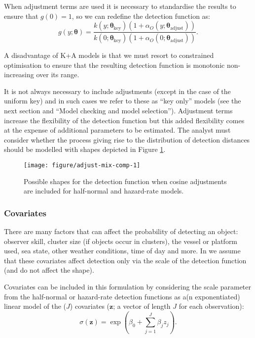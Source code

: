 \documentclass[article]{jss}\usepackage[]{graphicx}\usepackage[]{color}
\makeatletter
\def\maxwidth{ %
  \ifdim\Gin@nat@width>\linewidth
    \linewidth
  \else
    \Gin@nat@width
  \fi
}
\makeatother
\begin{document}
When adjustment terms are used it is necessary to standardise the results to ensure that $g(0)=1$, so we can redefine the detection function as:
$$
g(y; \boldsymbol{\theta}) = \frac{k(y; \boldsymbol{\theta}_\text{key})\left( 1+ \alpha_O(y; \boldsymbol{\theta}_\text{adjust})\right)}{k(0; \boldsymbol{\theta}_\text{key})\left( 1+ \alpha_O(0; \boldsymbol{\theta}_\text{adjust})\right)}.
$$

A disadvantage of K+A models is that we must resort to constrained optimisation \citep[via the  package;][]{rsolnp-pkg} to ensure that the resulting detection function is monotonic non-increasing over its range.

It is not always necessary to include adjustments (except in the case of the uniform key) and in such cases we refer to these as ``key only'' models (see the next section and ``Model checking and model selection''). Adjustment terms increase the flexibility of the detection function but this added flexibility comes at the expense of additional parameters to be estimated. The analyst must consider whether the process giving rise to the distribution of detection distances should be modelled with shapes depicted in Figure \ref{fig:keyadj}.

\begin{figure}
\begin{center}
\begin{Schunk}

\texttt{[image: figure/adjust-mix-comp-1]} \end{Schunk}
\caption{Possible shapes for the detection function when cosine adjustments are included for half-normal and hazard-rate models.}
\label{fig:keyadj}
\end{center}
\end{figure}



\subsubsection{Covariates}

There are many factors that can affect the probability of detecting an object: observer skill, cluster size (if objects occur in clusters), the vessel or platform used, sea state, other weather conditions, time of day and more. In  we assume that these covariates affect detection only via the scale of the detection function (and do not affect the shape).

Covariates can be included in this formulation by considering the scale parameter from the half-normal or hazard-rate detection functions as a(n exponentiated) linear model of the ($J$) covariates ($\mathbf{z}$; a vector of length $J$ for each observation):
$$
\sigma(\mathbf{z}) = \exp(\beta_0 + \sum_{j=1}^J \beta_j z_j).
$$
\end{document}
